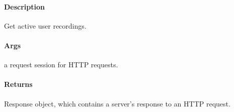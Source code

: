 \documentclass[letterpaper,10pt,english]{sphinxmanual}
\begin{document}
\begin{fulllineitems}
\label{\detokenize{gemini_lidar_hub_API:gemini_lidar_hub_API.get_lidar_hub_active_rec}}
\pysigstartsignatures
{}
\pysigstopsignatures

\paragraph{Description}
\label{\detokenize{gemini_lidar_hub_API:id1}}
\sphinxAtStartPar
Get active user recordings.


\paragraph{Args}
\label{\detokenize{gemini_lidar_hub_API:args}}\begin{description}
\sphinxAtStartPar
a request session for HTTP requests.

\end{description}


\paragraph{Returns}
\label{\detokenize{gemini_lidar_hub_API:returns}}\begin{description}
\sphinxAtStartPar
Response object, which contains a server’s response to an HTTP request.

\end{description}

\end{fulllineitems}

\end{document}
